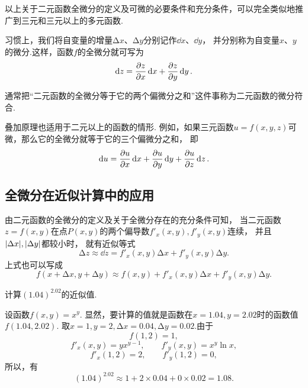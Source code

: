 以上关于二元函数全微分的定义及可微的必要条件和充分条件，可以完全类似地推广到三元和三元以上的多元函数.

习惯上，我们将自变量的增量\(\increment x\)、\(\increment y\)分别记作\(\dd{x}\)、\(\dd{y}\)，
并分别称为自变量\(x\)、\(y\)的微分.这样，函数\(f\)的全微分就可写为\[
	\dd{z}=\pdv{z}{x}\dd{x}+\pdv{z}{y}\dd{y}.
\]

通常把“二元函数的全微分等于它的两个偏微分之和”这件事称为二元函数的微分符合.

叠加原理也适用于二元以上的函数的情形.
例如，如果三元函数\(u = f(x,y,z)\)可微，那么它的全微分就等于它的三个偏微分之和，
即\[
	\dd{u} = \pdv{u}{x} \dd{x} + \pdv{u}{y} \dd{y} + \pdv{u}{z} \dd{z}.
\]

\subsection{全微分在近似计算中的应用}
由二元函数的全微分的定义及关于全微分存在的充分条件可知，
当二元函数\(z = f(x,y)\)在点\(P(x,y)\)的两个偏导数\(f'_x(x,y),f'_y(x,y)\)连续，
并且\(\abs{\Delta x},\abs{\Delta y}\)都较小时，
就有近似等式\[
	\increment z \approx \dd{z} = f'_x(x,y) \increment x + f'_y(x,y) \increment y.
\]
上式也可以写成\[
	f(x+\increment x,y+\increment y) \approx f(x,y) + f'_x(x,y) \increment x + f'_y(x,y) \increment y.
\]

\begin{example}
计算\((1.04)^{2.02}\)的近似值.
\begin{solution}
设函数\(f(x,y) = x^y\).
显然，要计算的值就是函数在\(x=1.04,y=2.02\)时的函数值\(f(1.04,2.02)\).
取\(x=1,y=2,\increment x=0.04,\increment y=0.02\).由于\[
	f(1,2)=1,
\]\[
	f'_x(x,y) = y x^{y-1}, \qquad f'_y(x,y) = x^y \ln x,
\]\[
	f'_x(1,2) = 2, \qquad f'_y(1,2) = 0,
\]
所以，有\[
	(1.04)^{2.02} \approx 1 + 2 \times 0.04 + 0 \times 0.02 = 1.08.
\]
\end{solution}
\end{example}
